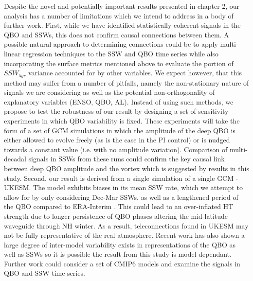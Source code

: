 Despite the novel and potentially important results presented in chapter 2, our analysis has a number of limitations which we intend to address in a body of further work. First, while we have identified statistically coherent signals in the QBO and SSWs, this does not confirm causal connections between them. A possible natural approach to determining connections could be to apply multi-linear regression techniques to the SSW and QBO time series while also incorporating the surface metrics mentioned above to evaluate the portion of $SSW_{5yr}$ variance accounted for by other variables. We expect however, that this method may suffer from a number of pitfalls, namely the non-stationary nature of signals we are considering as well as the potential non-orthogonality of explanatory variables (ENSO, QBO, AL). Instead of using such methods, we propose to test the robustness of our result by designing a set of sensitivity experiments in which QBO variability is fixed. These experiments will take the form of a set of GCM simulations in which the amplitude of the deep QBO is either allowed to evolve freely (as is the case in the PI control) or is nudged towards a constant value (i.e. with no amplitude variation). Comparison of multi-decadal signals in SSWs from these runs could confirm the key causal link between deep QBO amplitude and the vortex which is suggested by results in this study. Second, our result is derived from a single simulation of a single GCM - UKESM. The model exhibits biases in its mean SSW rate, which we attempt to allow for by only considering Dec-Mar SSWs, as well as a lengthened period of the QBO compared to ERA-Interim \citep{Bushell2020}. This could lead to an over-inflated HT strength due to longer persistence of QBO phases altering the mid-latitude waveguide through NH winter. As a result, teleconnections found in UKESM may not be fully representative of the real atmosphere. Recent work has also shown a large degree of inter-model variability exists in representations of the QBO as well as SSWs \citep{Bushell2020,ayarzag2020} so it is possible the result from this study is model dependant. Further work could consider a set of CMIP6 models and examine the signals in QBO and SSW time series. 

